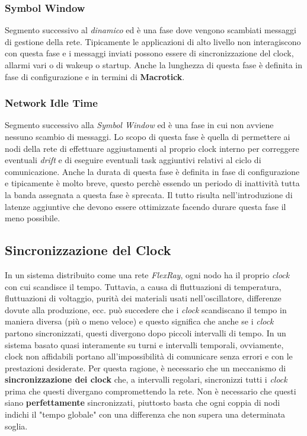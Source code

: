 \subsubsection{Symbol Window}
Segmento successivo al \emph{dinamico} ed è una fase dove vengono scambiati messaggi di gestione della rete. Tipicamente le applicazioni di alto livello non interagiscono con questa fase \cite{ni_flexray} e i messaggi inviati possono essere di sincronizzazione del clock, allarmi vari o di wakeup o startup. Anche la lunghezza di questa fase è definita in fase di configurazione e in termini di \textbf{Macrotick}.

\subsubsection{Network Idle Time}
Segmento successivo alla \emph{Symbol Window} ed è una fase in cui non avviene nessuno scambio di messaggi. Lo scopo di questa fase è quella di permettere ai nodi della rete di effettuare aggiustamenti al proprio clock interno per correggere eventuali \emph{drift} e di eseguire eventuali task aggiuntivi relativi al ciclo di comunicazione. Anche la durata di questa fase è definita in fase di configurazione e tipicamente è molto breve, questo perchè essendo un periodo di inattività tutta la banda assegnata a questa fase è sprecata. Il tutto risulta nell'introduzione di latenze aggiuntive che devono essere ottimizzate facendo durare questa fase il meno possibile. \cite{flexray_specification}

\subsection{Sincronizzazione del Clock}
In un sistema distribuito come una rete \emph{FlexRay}, ogni nodo ha il proprio \emph{clock} con cui scandisce il tempo. Tuttavia, a causa di fluttuazioni di temperatura, fluttuazioni di voltaggio, purità dei materiali usati nell'oscillatore, differenze dovute alla produzione, ecc. può succedere che i \emph{clock} scandiscano il tempo in maniera diversa (più o meno veloce) e questo significa che anche se i \emph{clock} partono sincronizzati, questi divergono dopo piccoli intervalli di tempo. In un sistema basato quasi interamente su turni e intervalli temporali, ovviamente, clock non affidabili portano all'impossibilità di comunicare senza errori e con le prestazioni desiderate. Per questa ragione, è necessario che un meccanismo di \textbf{sincronizzazione dei clock} che, a intervalli regolari, sincronizzi tutti i \emph{clock} prima che questi divergano compromettendo la rete. Non è necessario che questi siano \textbf{perfettamente} sincronizzati, piuttosto basta che ogni coppia di nodi indichi il "tempo globale" con una differenza che non supera una determinata soglia. \cite{flexray_specification}

